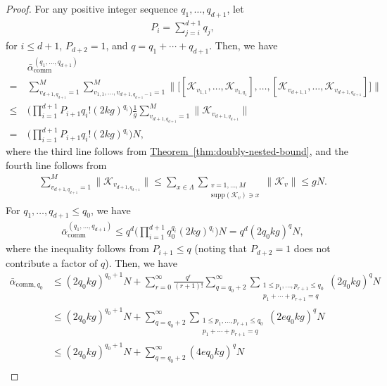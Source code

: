 \documentclass[aps,pra,reprint,groupedaddress,floatfix]{revtex4-2}
\newcommand{\thm}[1]{\hyperref[thm:#1]{Theorem~\ref*{thm:#1}}}
\renewcommand{\comm}{\mathrm{comm}}
\newcommand{\supp}{\mathrm{supp}}
\newcommand{\mc}{\mathcal}
\begin{document}
\begin{proof} 
    For any positive integer sequence $q_1, \ldots, q_{d+1}$, let 
    \begin{align*}
        P_{i} = \sum_{j=i}^{d+1} q_j,
    \end{align*}
    for $i\le d+1$, $P_{d+2} = 1$, and $q = q_1+\cdots+q_{d+1}$. Then, we have 
    \begin{align*}
    &\bar{\alpha}_{\comm}^{(q_1, \ldots, q_{d+1})}\\
    =~& \sum_{v_{d+1, q_{d+1}}=1}^{M} \sum_{v_{1,1}, \ldots, v_{d+1, q_{d+1}-1} = 1}^M \bigg\| \Big[ 
         [\mc K_{v_{1,1}}, \ldots, \mc K_{v_{1,q_1}}], \ldots, 
        [\mc K_{v_{d+1,1}}, \ldots, \mc K_{v_{d+1,q_{d+1}}}]
     \Big] \bigg\| \\
    \le~& \bigg(\prod_{i=1}^{d+1}P_{i+1}q_i!(2kg)^{q_i }\bigg)\frac{1}{g}\sum_{v_{d+1, q_{d+1}}=1}^{M} \|\mc K_{v_{d+1, q_{d+1}}}\|\\
    =~&  \bigg(\prod_{i=1}^{d+1}P_{i+1}q_i!(2kg)^{q_i }\bigg)N,
    \end{align*}
where the third line follows from \thm{doubly-nested-bound}, and the fourth line follows from 
\begin{align*}
    \sum_{v_{d+1,q_{d+1}}=1}^{M}\|\mc K_{v_{d+1, q_{d+1}}}\|\le \sum_{x\in\Lambda}\sum_{\substack{v = 1, \ldots, M \\ \supp(\mc K_v)\ni x}} \|\mc K_{v}\|\le gN.
\end{align*}
For $q_1, \ldots, q_{d+1}\le q_0$, we have 
\begin{align*}
    \bar{\alpha}_{\comm}^{(q_1, \ldots, q_{d+1})}\le q^{d}\bigg(\prod_{i=1}^{d+1}q_0^{q_{i}}(2kg)^{q_i }\bigg)N = q^{d} (2q_0kg)^q N,
\end{align*}
where the inequality follows from $P_{i+1}\le q$ (noting that $P_{d+2} = 1$ does not contribute a factor of $q$). 
    Then, we have 
    \begin{align*}
    \bar{\alpha}_{\comm,q_0} &\le (2q_0 kg)^{q_0+1} N+ \sum_{r = 0}^{\infty}\frac{q^{r} }{(r+1)!} \sum_{q=q_0+2}^{\infty}\sum_{\substack{1\le p_1, \ldots, p_{r+1}\le q_0\\p_1+\cdots+p_{r+1} = q}}(2q_0 kg)^q N \\ 
    &\le  (2q_0 kg)^{q_0+1} N+  \sum_{q=q_0+2}^{\infty}\sum_{\substack{1\le p_1, \ldots, p_{r+1}\le q_0\\p_1+\cdots+p_{r+1} = q}} (2eq_0 kg)^q N\\
    &\le(2q_0 kg)^{q_0+1} N+  \sum_{q=q_0+2}^{\infty} (4eq_0 kg)^q N   \\

\end{align*}
\end{proof}
\end{document}
